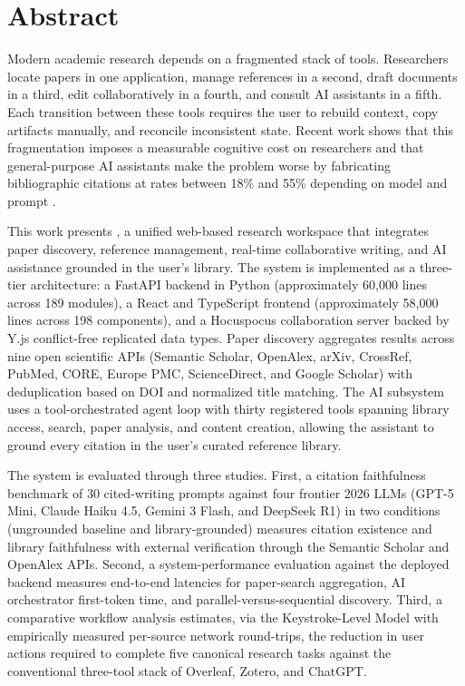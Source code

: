 \chapter*{Abstract}

Modern academic research depends on a fragmented stack of tools. Researchers locate papers in one application, manage references in a second, draft documents in a third, edit collaboratively in a fourth, and consult AI assistants in a fifth. Each transition between these tools requires the user to rebuild context, copy artifacts manually, and reconcile inconsistent state. Recent work shows that this fragmentation imposes a measurable cognitive cost on researchers and that general-purpose AI assistants make the problem worse by fabricating bibliographic citations at rates between 18\% and 55\% depending on model and prompt \cite{walters2023fabrication}.

This work presents \sh{}, a unified web-based research workspace that integrates paper discovery, reference management, real-time collaborative writing, and AI assistance grounded in the user's library. The system is implemented as a three-tier architecture: a FastAPI backend in Python (approximately 60{,}000 lines across 189 modules), a React and TypeScript frontend (approximately 58{,}000 lines across 198 components), and a Hocuspocus collaboration server backed by Y.js conflict-free replicated data types. Paper discovery aggregates results across nine open scientific APIs (Semantic Scholar, OpenAlex, arXiv, CrossRef, PubMed, CORE, Europe PMC, ScienceDirect, and Google Scholar) with deduplication based on DOI and normalized title matching. The AI subsystem uses a tool-orchestrated agent loop with thirty registered tools spanning library access, search, paper analysis, and content creation, allowing the assistant to ground every citation in the user's curated reference library.

The system is evaluated through three studies. First, a citation faithfulness benchmark of 30 cited-writing prompts against four frontier 2026 LLMs (GPT-5 Mini, Claude Haiku 4.5, Gemini 3 Flash, and DeepSeek R1) in two conditions (ungrounded baseline and library-grounded) measures citation existence and library faithfulness with external verification through the Semantic Scholar and OpenAlex APIs. Second, a system-performance evaluation against the deployed backend measures end-to-end latencies for paper-search aggregation, AI orchestrator first-token time, and parallel-versus-sequential discovery. Third, a comparative workflow analysis estimates, via the Keystroke-Level Model with empirically measured per-source network round-trips, the reduction in user actions required to complete five canonical research tasks against the conventional three-tool stack of Overleaf, Zotero, and ChatGPT.

